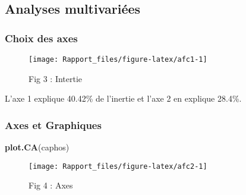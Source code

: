 \documentclass[
]{article}
\newenvironment{Shaded}{\begin{snugshade}}{\end{snugshade}}
\newcommand{\AttributeTok}[1]{\textcolor[rgb]{0.13,0.29,0.53}{#1}}
\newcommand{\ConstantTok}[1]{\textcolor[rgb]{0.56,0.35,0.01}{#1}}
\newcommand{\DecValTok}[1]{\textcolor[rgb]{0.00,0.00,0.81}{#1}}
\newcommand{\DocumentationTok}[1]{\textcolor[rgb]{0.56,0.35,0.01}{\textbf{\textit{#1}}}}
\newcommand{\FunctionTok}[1]{\textcolor[rgb]{0.13,0.29,0.53}{\textbf{#1}}}
\newcommand{\NormalTok}[1]{#1}
\newcommand{\OtherTok}[1]{\textcolor[rgb]{0.56,0.35,0.01}{#1}}
\newcommand{\SpecialCharTok}[1]{\textcolor[rgb]{0.81,0.36,0.00}{\textbf{#1}}}
\newcommand{\StringTok}[1]{\textcolor[rgb]{0.31,0.60,0.02}{#1}}
\begin{document}
\subsection{Analyses multivariées}\label{analyses-multivariuxe9es}

\subsubsection{Choix des axes}\label{choix-des-axes}

\begin{Shaded}
\end{Shaded}

\begin{figure}

{\centering \texttt{[image: Rapport\_files/figure-latex/afc1-1]} 

}

\caption{Fig 3 : Intertie}\label{fig:afc1}
\end{figure}

L'axe 1 explique 40.42\% de l'inertie et l'axe 2 en explique 28.4\%.

\subsubsection{Axes et Graphiques}\label{axes-et-graphiques}

\begin{Shaded}
\begin{Highlighting}[]
\FunctionTok{plot.CA}\NormalTok{(caphos)}
\end{Highlighting}
\end{Shaded}

\begin{figure}

{\centering \texttt{[image: Rapport\_files/figure-latex/afc2-1]} 

}

\caption{Fig 4 : Axes}\label{fig:afc2}
\end{figure}
\end{document}
